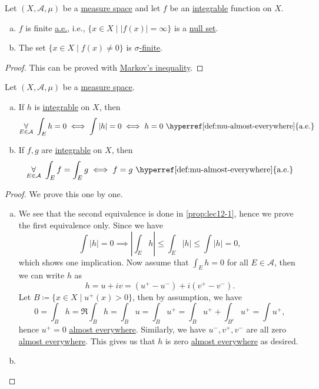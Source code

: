 \begin{lemma}\label{lma:lec-13-2}
	Let \((X, \mathcal{A} , \mu )\) be a \hyperref[def:measure-space]{measure space} and let \(f\) be an \hyperref[def:integrable]{integrable} function on \(X\).
	\begin{enumerate}[(a)]
		\item \(f\) is finite \hyperref[def:mu-almost-everywhere]{a.e.}, i.e., \(\{x\in X \mid \left\vert f(x) \right\vert = \infty \}\) is a \hyperref[def:null-set]{null set}.
		\item The set \(\{x\in X \mid f(x)\neq 0\}\) is \hyperref[def:finite-measure]{\(\sigma \)-finite}.
	\end{enumerate}
\end{lemma}
\begin{proof}
	This can be proved with \hyperref[lma:Markov-inequality]{Markov's inequality}.
\end{proof}

\begin{proposition}\label{prop:lec-13}
	Let \((X, \mathcal{A} , \mu )\) be a \hyperref[def:measure-space]{measure space}.
	\begin{enumerate}[(a)]
		\item If \(h\) is \hyperref[def:integrable]{integrable} on \(X\), then
		      \[
			      \underset{E\in \mathcal{A} }{\forall }\ \int_E h = 0 \iff \int \left\vert h \right\vert = 0 \iff h = 0 \text{ \hyperref[def:mu-almost-everywhere]{a.e.}}
		      \]
		\item If \(f, g\) are \hyperref[def:integrable]{integrable} on \(X\), then
		      \[
			      \underset{E\in \mathcal{A} }{\forall }\ \int _E f = \int _E g \iff f = g \text{ \hyperref[def:mu-almost-everywhere]{a.e.}}
		      \]
	\end{enumerate}
\end{proposition}
\begin{proof}
	We prove this one by one.
	\begin{enumerate}[(a)]
		\item We see that the second equivalence is done in \autoref{prop:lec12-1}, hence we prove the first equivalence only. Since we have
		      \[
			      \int \left\vert h \right\vert = 0 \implies \left\vert \int _E h \right\vert \leq \int _E \left\vert h \right\vert \leq \int \left\vert h \right\vert = 0,
		      \]
		      which shows one implication. Now assume that \(\int _E h = 0\) for all \(E\in \mathcal{A} \), then we can write \(h\) as
		      \[
			      h = u + iv = (u^+ - u^-) + i (v^+ - v^-).
		      \]
		      Let \(B\coloneqq \{x\in X \mid u^+(x)>0\}\), then by assumption, we have
		      \[
			      0 = \int _B h = \Re \int _B h = \int _B u = \int _B u^+ = \int _B u^+ + \int _{B^{c}} u^+ = \int u^+,
		      \]
		      hence \(u^+ = 0\) \hyperref[def:mu-almost-everywhere]{almost everywhere}. Similarly, we have \(u^-, v^+, v^-\) are all zero \hyperref[def:mu-almost-everywhere]{almost everywhere}. This gives us that \(h\) is zero  \hyperref[def:mu-almost-everywhere]{almost everywhere} as desired.
		\item {}
	\end{enumerate}
\end{proof}

